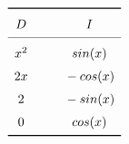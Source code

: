\[
\renewcommand{\arraystretch}{1.5}
\begin{array}{c @{\hspace*{1.0cm}} c}\toprule
	D & I \\\cmidrule{1-2}
	x^2\tikzmark{Left 1} & \tikzmark{Right 1}sin(x) \\
	2x \tikzmark{Left 2} & \tikzmark{Right 2}-cos(x) \\      
	2  \tikzmark{Left 3} & \tikzmark{Right 3}-sin(x)\\      
	0  \tikzmark{Left 4} & \tikzmark{Right 4}cos(x) \\\bottomrule
\end{array}
\]
%
%
%